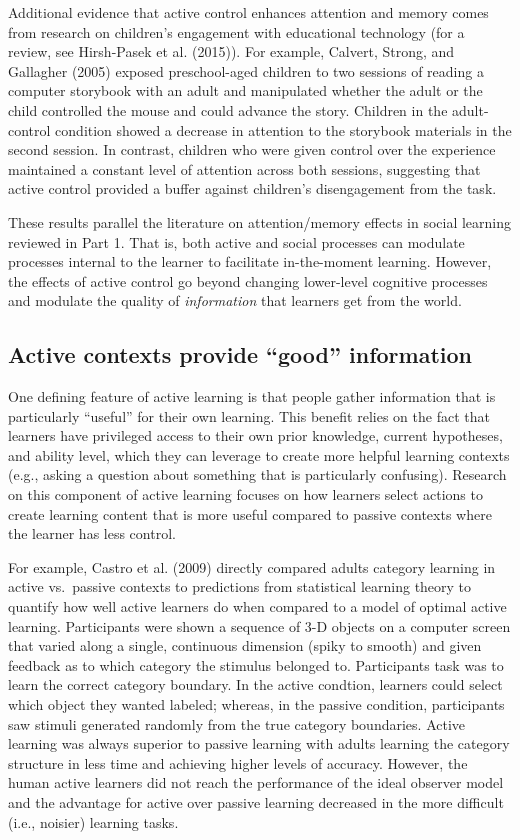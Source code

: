 \documentclass[english,floatsintext,man]{apa6}
\theoremstyle{definition}
\theoremstyle{definition}
\theoremstyle{definition}
\theoremstyle{remark}
\begin{document}
Additional evidence that active control enhances attention and memory
comes from research on children's engagement with educational technology
(for a review, see Hirsh-Pasek et al. (2015)). For example, Calvert,
Strong, and Gallagher (2005) exposed preschool-aged children to two
sessions of reading a computer storybook with an adult and manipulated
whether the adult or the child controlled the mouse and could advance
the story. Children in the adult-control condition showed a decrease in
attention to the storybook materials in the second session. In contrast,
children who were given control over the experience maintained a
constant level of attention across both sessions, suggesting that active
control provided a buffer against children's disengagement from the
task.

These results parallel the literature on attention/memory effects in
social learning reviewed in Part 1. That is, both active and social
processes can modulate processes internal to the learner to facilitate
in-the-moment learning. However, the effects of active control go beyond
changing lower-level cognitive processes and modulate the quality of
\emph{information} that learners get from the world.

\subsection{\texorpdfstring{Active contexts provide \enquote{good}
information}{Active contexts provide good information}}\label{active-contexts-provide-good-information}

One defining feature of active learning is that people gather
information that is particularly \enquote{useful} for their own
learning. This benefit relies on the fact that learners have privileged
access to their own prior knowledge, current hypotheses, and ability
level, which they can leverage to create more helpful learning contexts
(e.g., asking a question about something that is particularly
confusing). Research on this component of active learning focuses on how
learners select actions to create learning content that is more useful
compared to passive contexts where the learner has less control.

For example, Castro et al. (2009) directly compared adults category
learning in active vs.~passive contexts to predictions from statistical
learning theory to quantify how well active learners do when compared to
a model of optimal active learning. Participants were shown a sequence
of 3-D objects on a computer screen that varied along a single,
continuous dimension (spiky to smooth) and given feedback as to which
category the stimulus belonged to. Participants task was to learn the
correct category boundary. In the active condtion, learners could select
which object they wanted labeled; whereas, in the passive condition,
participants saw stimuli generated randomly from the true category
boundaries. Active learning was always superior to passive learning with
adults learning the category structure in less time and achieving higher
levels of accuracy. However, the human active learners did not reach the
performance of the ideal observer model and the advantage for active
over passive learning decreased in the more difficult (i.e., noisier)
learning tasks.
\end{document}
